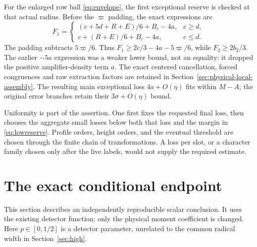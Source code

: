 \documentclass[11pt]{article}
\theoremstyle{definition}
\begin{document}
For the enlarged row ball \eqref{eq:envelope}, the first exceptional
reserve is checked at that actual radius. Before the $\varpi$ padding,
the exact expressions are
\[
 F_1=\begin{cases}
 (c+5d+R+E)/6+B_c-4a,&c\ge d,\\
 c+(R+E)/6+B_c-4a,&c\le d.
 \end{cases}
\]
The padding subtracts $5\varpi/6$. Thus
$F_1\ge2c/3-4a-5\varpi/6$, while $F_2\ge2b_2/3$.
The earlier $-5a$ expression was a weaker lower bound, not an equality:
it dropped the positive amplifier-density term $a$.
The exact centered cancellation, forced congruences and raw extraction
factors are retained in Section~\ref{sec:physical-local-assembly}.
The resulting main exceptional loss $4a+O(\eta)$ fits within $M-A$;
the original error branches retain their $3\sigma+O(\eta)$ bound.

Uniformity is part of the assertion. One first fixes the requested
final loss, then chooses the aggregate small losses below both that
loss and the margin in \eqref{eq:lowreserve}. Profile orders, height
orders, and the eventual threshold are chosen through the finite chain
of transformations. A loss per slot, or a character family chosen only
after the live labels, would not supply the required estimate.

\section{The exact conditional endpoint}\label{sec:endpoint}

This section describes an independently reproducible scalar conclusion.
It uses the existing detector function; only the physical moment
coefficient is changed. Here $p\in[0,1/2]$ is a detector parameter,
unrelated to the common radical width in Section~\ref{sec:high}.
\end{document}
